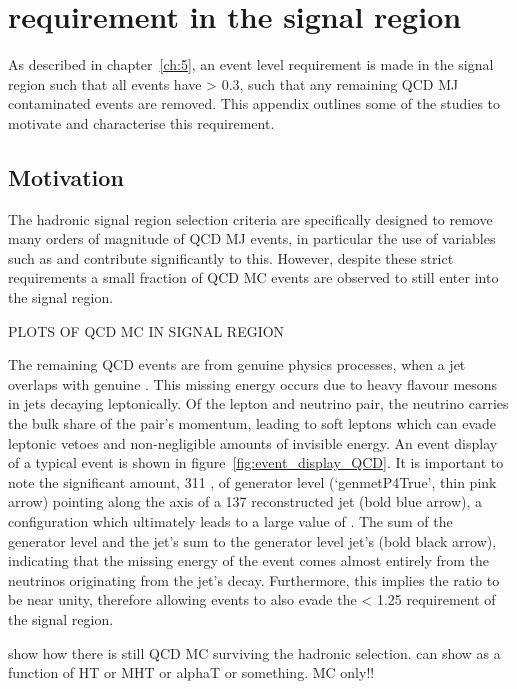 \label{ch:app_dphistar}


\chapter{\mindphistar requirement in the signal region}

As described in chapter~\ref{ch:5}, an event level requirement is made in the
signal region such that all events have \mindphistar > 0.3, such that any
remaining QCD MJ contaminated events are removed. This appendix outlines some of
the studies to motivate and characterise this requirement.

\section{Motivation}

The hadronic signal region selection criteria are specifically
designed to remove many orders of magnitude of QCD MJ events, in particular the
use of variables such as \alphat and \mhtmet contribute significantly to this.
However, despite these strict requirements a small fraction of QCD MC events are
observed to still enter into the signal region.

PLOTS OF QCD MC IN SIGNAL REGION

The remaining QCD events are from genuine physics processes, when a jet overlaps
with genuine \met. This missing energy occurs due to heavy flavour mesons in
jets decaying leptonically. Of the lepton and neutrino pair, the neutrino
carries the bulk share of the pair's momentum, leading to soft leptons which
can evade leptonic vetoes and non-negligible amounts of invisible energy. An
event display of a typical event is shown in figure~\ref{fig:event_display_QCD}.
It is important to note the significant amount, 311 \gev, of generator level
\met (`genmetP4True', thin pink arrow) pointing along the axis of a 137
\gev \Pt reconstructed jet (bold blue arrow), a configuration which ultimately
leads to a large value of \alphat. The sum of the generator level \met \Pt and
the jet's \Pt sum to the generator level jet's \Pt (bold black arrow),
indicating that the missing energy of the event comes almost entirely from the
neutrinos originating from the jet's decay. Furthermore, this implies the ratio
\mhtmet to be near unity, therefore allowing events to also evade the \mhtmet <
1.25 requirement of the signal region.


show how there is still QCD MC surviving the hadronic selection. can show as a
function of HT or MHT or alphaT or something. MC only!!

